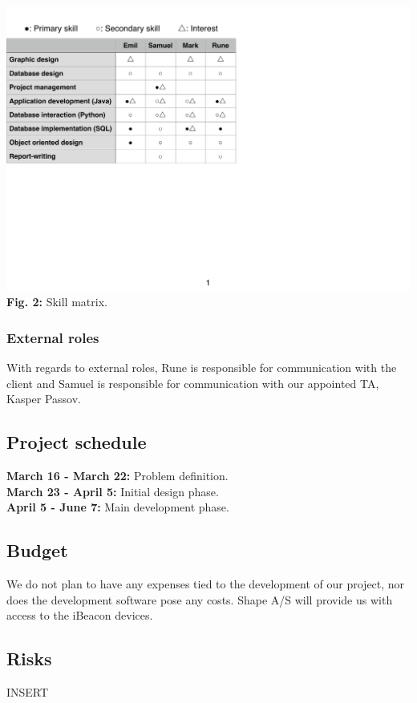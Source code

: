\documentclass[12pt]{article}
\begin{document}
\includegraphics[trim=0 64mm 0 0, clip]{skill_matrix}\\
\textbf{Fig. 2:} Skill matrix.\\


\subsubsection{External roles}
With regards to external roles, Rune is responsible for communication with the client and Samuel is responsible for communication with our appointed TA, Kasper Passov.\\



\subsection{Project schedule}
\textbf{March 16 - March 22:} Problem definition.\\
\textbf{March 23 - April 5:} Initial design phase.\\
\textbf{April 5 - June 7:} Main development phase.\\



\subsection{Budget}
We do not plan to have any expenses tied to the development of our project, nor does the development software pose any costs. Shape A/S will provide us with access to the iBeacon devices.\\


\subsection{Risks}
INSERT\\
\end{document}
